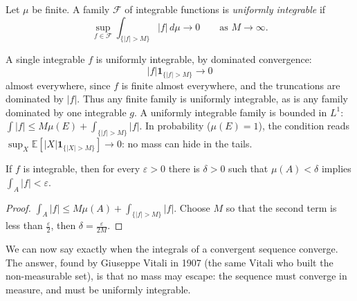 \begin{definition}
Let $\mu$ be finite. A family $\mathcal F$ of integrable functions is \emph{uniformly integrable} if
\[\sup_{f\in\mathcal F}\int_{\{|f|>M\}}|f|\,d\mu\longrightarrow0\qquad\text{as }M\to\infty.\]
\end{definition}

A single integrable $f$ is uniformly integrable, by dominated convergence:
\[
|f|\mathbf 1_{\{|f|>M\}}\to0
\]
almost everywhere, since $f$ is finite almost everywhere, and the truncations are dominated by $|f|$.
Thus any finite family is uniformly integrable, as is any family dominated by one integrable $g$. A uniformly integrable family is bounded in $L^1$: $\int|f|\le M\mu(E)+\int_{\{|f|>M\}}|f|$. In probability ($\mu(E)=1$), the condition reads
$\sup_X\mathbb E[|X|\mathbf 1_{\{|X|>M\}}]\to0$: no mass can hide in the tails.

\begin{lemma}\label{lem:abscont}
If $f$ is integrable, then for every $\varepsilon>0$ there is $\delta>0$ such that $\mu(A)<\delta$ implies $\int_A|f|<\varepsilon$.
\end{lemma}
\begin{proof}
$\int_A|f|\le M\mu(A)+\int_{\{|f|>M\}}|f|$. Choose $M$ so that the second term is less than $\frac\varepsilon2$, then $\delta=\frac\varepsilon{2M}$.
\end{proof}

We can now say exactly when the integrals of a convergent sequence converge. The answer, found by Giuseppe Vitali in 1907 (the
same Vitali who built the non-measurable set), is that no mass may escape: the sequence must converge in measure, and must be
uniformly integrable.

